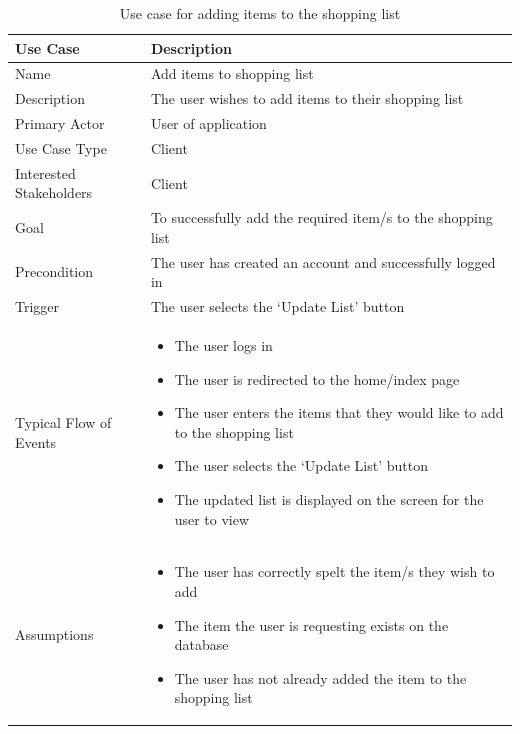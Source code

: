 \documentclass[10pt,twocolumn]{witseiepaper}
\begin{document}
		\begin{table}[htbp]
			\centering
			\caption{Use case for adding items to the shopping list}
			\label{uc:add_item}
			\begin{tabular}{|p{}|p{}|}
				\hline
				\textbf{Use Case} & \textbf{Description} \\ \hline
				Name & Add items to shopping list \\ \hline
				Description & The user wishes to add items to their shopping list \\ \hline
				Primary Actor & User of application \\ \hline
				Use Case Type & Client \\ \hline
				Interested Stakeholders & Client \\ \hline
				Goal & To successfully add the required item/s to the shopping list \\ \hline
				Precondition & The user has created an account and successfully logged in \\ \hline
				Trigger & The user selects the `Update List' button \\ \hline
				Typical Flow of Events & 
				\begin{itemize}
					\item The user logs in
					\item The user is redirected to the home/index page
					\item The user enters the items that they would like to add to the shopping list
					\item The user selects the `Update List' button
					\item The updated list is displayed on the screen for the user to view
				\end{itemize}
				\\ \hline
				Assumptions &
					\begin{itemize}
						\item The user has correctly spelt the item/s they wish to add
						\item The item the user is requesting exists on the database
						\item The user has not already added the item to the shopping list
					\end{itemize}
					\\ \hline
			\end{tabular}
		\end{table}
		
\end{document}
